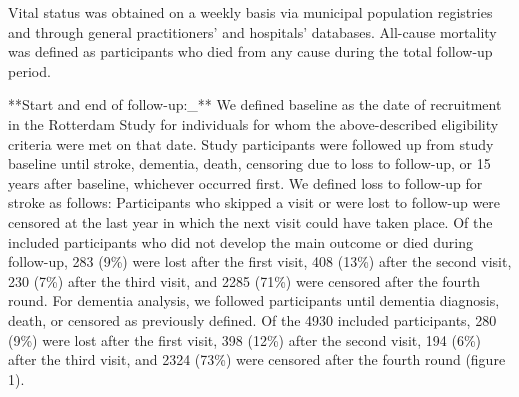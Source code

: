 \documentclass[
]{book}
\begin{document}
Vital status was obtained on a weekly basis via municipal population registries and through general practitioners' and hospitals' databases. All-cause mortality was defined as participants who died from any cause during the total follow-up period.

**Start and end of follow-up:\_** We defined baseline as the date of recruitment in the Rotterdam Study for individuals for whom the above-described eligibility criteria were met on that date. Study participants were followed up from study baseline until stroke, dementia, death, censoring due to loss to follow-up, or 15 years after baseline, whichever occurred first. We defined loss to follow-up for stroke as follows: Participants who skipped a visit or were lost to follow-up were censored at the last year in which the next visit could have taken place. Of the included participants who did not develop the main outcome or died during follow-up, 283 (9\%) were lost after the first visit, 408 (13\%) after the second visit, 230 (7\%) after the third visit, and 2285 (71\%) were censored after the fourth round. For dementia analysis, we followed participants until dementia diagnosis, death, or censored as previously defined. Of the 4930 included participants, 280 (9\%) were lost after the first visit, 398 (12\%) after the second visit, 194 (6\%) after the third visit, and 2324 (73\%) were censored after the fourth round (figure 1).
\end{document}
